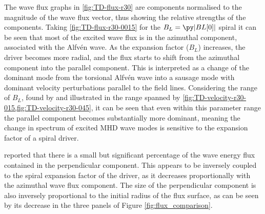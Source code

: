 The wave flux graphs in \cref{fig:TD-flux-r30} are components normalised to the magnitude of the wave flux vector, thus showing the relative strengths of the components.
Taking \cref{fig:TD-flux-r30-0015} for the $B_L=\py|BL[0]|$ spiral it can be seen that most of the excited wave flux is in the azimuthal component, associated with the Alfv\'en wave.
As the expansion factor ($B_L$) increases, the driver becomes more radial, and the flux starts to shift from the azimuthal component into the parallel component.
This is interpreted as a change of the dominant mode from the torsional Alfv\'en wave into a sausage mode with dominant velocity perturbations parallel to the field lines.
Considering the range of $B_L$, found by \cite{bonet2008} and illustrated in the range spanned by \cref{fig:TD-velocity-r30-015,fig:TD-velocity-r30-045}, it can be seen that even within this parameter range the parallel component becomes substantially more dominant, meaning the change in spectrum of excited MHD wave modes is sensitive to the expansion factor of a spiral driver.

\cite{mumford2015} reported that there is a small but significant percentage of the wave energy flux contained in the perpendicular component.
This appears to be inversely coupled to the spiral expansion factor of the driver, as it decreases proportionally with the azimuthal wave flux component.
The size of the perpendicular component is also inversely proportional to the initial radius of the flux surface, as can be seen by its decrease in the three panels of Figure \ref{fig:flux_comparison}.

